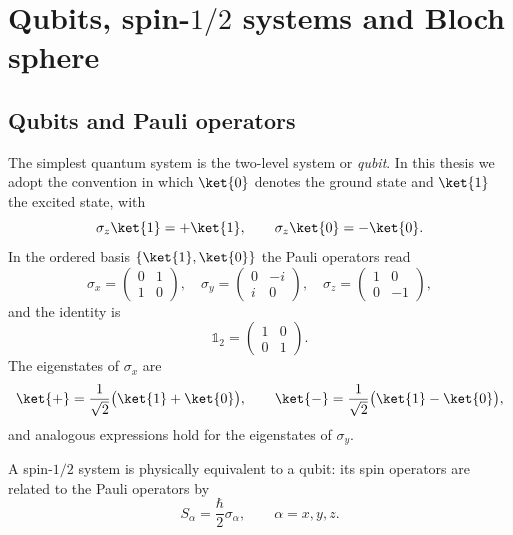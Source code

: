\section{Qubits, spin-\texorpdfstring{$1/2$}{1/2} systems and Bloch sphere}

\subsection{Qubits and Pauli operators}

The simplest quantum system is the two-level system or \emph{qubit}. 
In this thesis we adopt the convention in which $\ket{0}$ denotes the ground state and $\ket{1}$ the excited state, with
\begin{equation}
	\sigma_z \ket{1} = + \ket{1},
	\qquad
	\sigma_z \ket{0} = - \ket{0}.
\end{equation}
In the ordered basis $\{\ket{1},\ket{0}\}$ the Pauli operators read
\begin{equation}
	\sigma_x = 
	\begin{pmatrix}
		0 & 1 \\
		1 & 0
	\end{pmatrix},
	\quad
	\sigma_y =
	\begin{pmatrix}
		0 & -i \\
		i & 0
	\end{pmatrix},
	\quad
	\sigma_z =
	\begin{pmatrix}
		1 & 0 \\
		0 & -1
	\end{pmatrix},
\end{equation}
and the identity is
\begin{equation}
	\mathbb{1}_2 =
	\begin{pmatrix}
		1 & 0 \\
		0 & 1
	\end{pmatrix}.
\end{equation}
The eigenstates of $\sigma_x$ are
\begin{equation}
	\ket{+} = \frac{1}{\sqrt{2}}\bigl(\ket{1} + \ket{0}\bigr),
	\qquad
	\ket{-} = \frac{1}{\sqrt{2}}\bigl(\ket{1} - \ket{0}\bigr),
\end{equation}
and analogous expressions hold for the eigenstates of $\sigma_y$.

A spin-$1/2$ system is physically equivalent to a qubit: its spin operators are related to the Pauli operators by
\begin{equation}
	S_\alpha = \frac{\hbar}{2} \sigma_\alpha,
	\qquad
	\alpha = x,y,z.
\end{equation}

